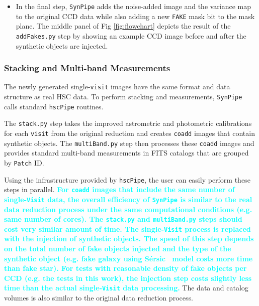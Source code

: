\documentclass[useamsfonts]{pasj01}
\def\ser{{S\'{e}rsic\ }}
\def\hscpipe{\texttt{hscPipe}}
\def\synpipe{\texttt{SynPipe}}
\def\coadd{\texttt{coadd}}
\def\visit{\texttt{visit}}
\newcommand{\song}[1]{\textcolor{cyan} {\textbf{#1}}}
\begin{document}
\begin{itemize}
        \item In the final step, \synpipe{} adds the noise-added image and the 
            variance map to the original CCD data while also adding a new 
            \texttt{FAKE} mask bit to the mask plane.
            The middle panel of Fig \ref{fig:flowchart} depicts the result of the
            \texttt{addFakes.py} step by showing an example CCD image before and 
            after the synthetic objects are injected.
    
    \end{itemize}

\subsubsection{Stacking and Multi-band Measurements}
    \label{sssec:multiband}

    The newly generated single-\visit{} images have the same format and data
    structure as real HSC data. To perform stacking and measurements, \synpipe{} calls 
    standard \hscpipe{} routines.
    
    The \texttt{stack.py} step takes the improved astrometric and photometric
    calibrations for each \visit{} from the original reduction and creates
    \coadd{} images that contain synthetic objects.
    The \texttt{multiBand.py} step then processes these \coadd{} images and
    provides standard multi-band measurements in FITS catalogs that are grouped by
    \texttt{Patch} ID.

    Using the infrastructure provided by \hscpipe{}, the user can easily perform these 
    steps in parallel.  
    \song{
    For \texttt{coadd} images that include the same number of single-\texttt{Visit} 
    data, the overall efficiency of \synpipe{} is similar to the real data reduction
    process under the same computational conditions (e.g. same number of cores). 
    The \texttt{stack.py} and \texttt{multiBand.py} steps should cost very similar 
    amount of time. 
    The single-\texttt{Visit} process is replaced with the injection of synthetic 
    objects. 
    The speed of this step depends on the total number of fake objects injected and 
    the type of the synthetic object (e.g. fake galaxy using \ser{} model costs more 
    time than fake star).
    For tests with reasonable density of fake objects per CCD (e.g. the tests in this 
    work), the injection step costs slightly less time than the actual 
    single-\texttt{Visit} data processing. 
    }
    The data and catalog volumes is also similar to the original data reduction process.
\end{document}
